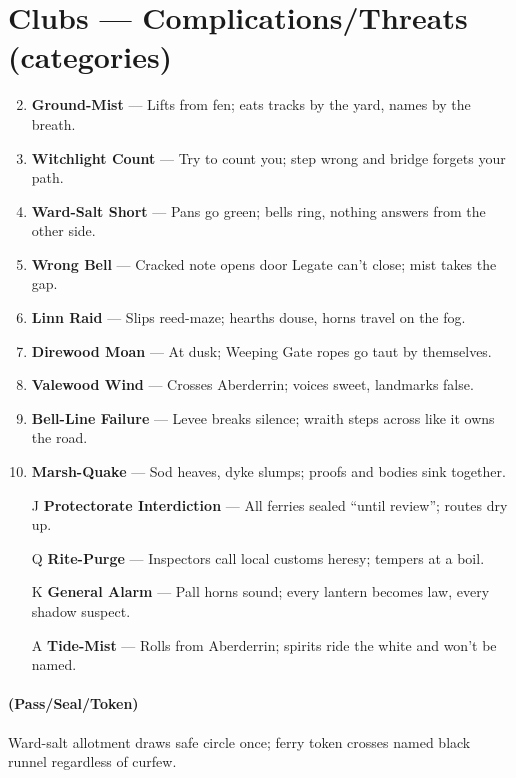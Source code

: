 \section*{Clubs --- Complications/Threats (categories)}
\label{sec:mistlands-complications}
\begin{enumerate}
\setcounter{enumi}{1}
\item \textbf{Ground-Mist} --- Lifts from fen; eats tracks by the yard, names by the breath.
\item \textbf{Witchlight Count} --- Try to count you; step wrong and bridge forgets your path.
\item \textbf{Ward-Salt Short} --- Pans go green; bells ring, nothing answers from the other side.
\item \textbf{Wrong Bell} --- Cracked note opens door Legate can't close; mist takes the gap.
\item \textbf{Linn Raid} --- Slips reed-maze; hearths douse, horns travel on the fog.
\item \textbf{Direwood Moan} --- At dusk; Weeping Gate ropes go taut by themselves.
\item \textbf{Valewood Wind} --- Crosses Aberderrin; voices sweet, landmarks false.
\item \textbf{Bell-Line Failure} --- Levee breaks silence; wraith steps across like it owns the road.
\item \textbf{Marsh-Quake} --- Sod heaves, dyke slumps; proofs and bodies sink together.
\item[J] \textbf{Protectorate Interdiction} --- All ferries sealed ``until review''; routes dry up.
\item[Q] \textbf{Rite-Purge} --- Inspectors call local customs heresy; tempers at a boil.
\item[K] \textbf{General Alarm} --- Pall horns sound; every lantern becomes law, every shadow suspect.
\item[A] \textbf{Tide-Mist} --- Rolls from Aberderrin; spirits ride the white and won't be named.
\end{enumerate}

\paragraph*{(Pass/Seal/Token)} Ward-salt allotment draws safe circle once; ferry token crosses named black runnel regardless of curfew.

